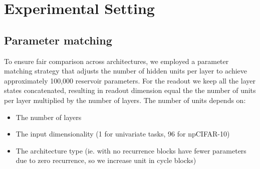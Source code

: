 \section{Experimental Setting}
\subsection{Parameter matching}
To ensure fair comparison across architectures,
 we employed a parameter matching strategy that adjusts the number of hidden units 
 per layer to achieve approximately 100,000 reservoir parameters. 
For the readout we keep all the layer states concatenated, resulting in readout dimension equal the the number of units per layer multiplied by the number of layers. 
The number of units depends on:
\begin{itemize}
    \item The number of layers
    \item The input dimensionality (1 for univariate tasks, 96 for npCIFAR-10)
    \item The architecture type (ie. \DCR\@ with no recurrence blocks have fewer parameters due to zero recurrence, so we increase unit in cycle blocks)
\end{itemize}

